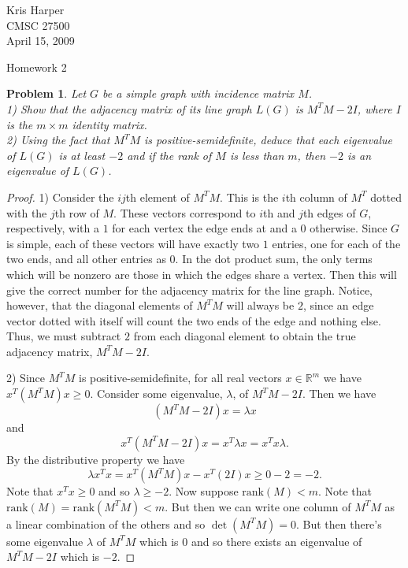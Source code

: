 \documentclass{article}
\newtheorem{problem}{Problem}
\newcommand{\rank}{\text{rank}}
\begin{document}
\begin{flushright}
Kris Harper\\

CMSC 27500\\

April 15, 2009
\end{flushright}

\begin{center}
Homework 2
\end{center}

\begin{flushleft}

\begin{problem}
Let $G$ be a simple graph with incidence matrix $M$.\\
1) Show that the adjacency matrix of its line graph $L(G)$ is $M^TM - 2I$, where $I$ is the $m \times m$ identity matrix.\\
2) Using the fact that $M^TM$ is positive-semidefinite, deduce that each eigenvalue of $L(G)$ is at least $-2$ and if the rank of $M$ is less than $m$, then $-2$ is an eigenvalue of $L(G)$.
\end{problem}
\begin{proof}
1) Consider the $ij$th element of $M^TM$. This is the $i$th column of $M^T$ dotted with the $j$th row of $M$. These vectors correspond to $i$th and $j$th edges of $G$, respectively, with a $1$ for each vertex the edge ends at and a $0$ otherwise. Since $G$ is simple, each of these vectors will have exactly two $1$ entries, one for each of the two ends, and all other entries as $0$. In the dot product sum, the only terms which will be nonzero are those in which the edges share a vertex. Then this will give the correct number for the adjacency matrix for the line graph. Notice, however, that the diagonal elements of $M^TM$ will always be $2$, since an edge vector dotted with itself will count the two ends of the edge and nothing else. Thus, we must subtract $2$ from each diagonal element to obtain the true adjacency matrix, $M^TM - 2I$.\newline

2) Since $M^TM$ is positive-semidefinite, for all real vectors $x \in \mathbb{R}^m$ we have $x^T(M^TM)x \geq 0$. Consider some eigenvalue, $\lambda$, of $M^TM - 2I$. Then we have
\[
(M^TM - 2I)x = \lambda x
\]
and
\[
x^T(M^TM - 2I)x = x^T \lambda x = x^Tx \lambda.
\]
By the distributive property we have
\[
\lambda x^Tx = x^T(M^TM)x - x^T(2I)x \geq 0 - 2 = -2.
\]
Note that $x^Tx \geq 0$ and so $\lambda \geq -2$. Now suppose $\rank (M) < m$. Note that $\rank(M) = \rank(M^TM) < m$. But then we can write one column of $M^TM$ as a linear combination of the others and so $\det (M^TM) = 0$. But then there's some eigenvalue $\lambda$ of $M^TM$ which is $0$ and so there exists an eigenvalue of $M^TM - 2I$ which is $-2$.
\end{proof}


\end{flushleft}
\end{document}

